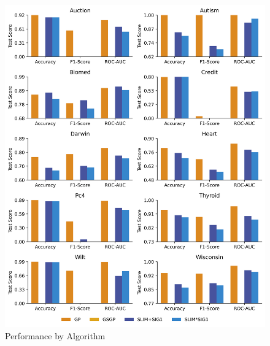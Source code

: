 
    \begin{figure}[H]
    \centering
    \includegraphics[width=\linewidth]{../Latex/Chapters/Figures/Results/final_comparison_performance.png}
    \caption{Performance by Algorithm}
    \label{fig:final_comparison_performance}
    \end{figure}
    